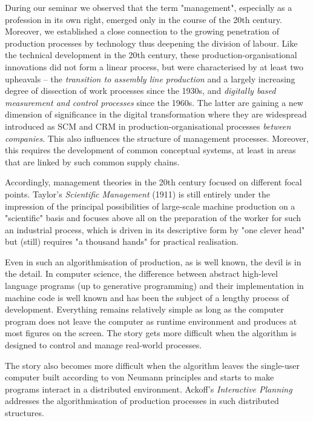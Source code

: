 \documentclass[11pt,a4paper]{article}
\begin{document}
During our seminar we observed that the term "management", especially as a
profession in its own right, emerged only in the course of the 20th century.
Moreover, we established a close connection to the growing penetration of
production processes by technology thus deepening the division of labour. Like
the technical development in the 20th century, these production-organisational
innovations did not form a linear process, but were characterised by at least
two upheavals -- the \emph{transition to assembly line production} and a
largely increasing degree of dissection of work processes since the 1930s, and
\emph{digitally based measurement and control processes} since the 1960s. The
latter are gaining a new dimension of significance in the digital
transformation where they are widespread introduced as SCM and CRM in
production-organisational processes \emph{between companies}. This also
influences the structure of management processes. Moreover, this requires the
development of common conceptual systems, at least in areas that are linked by
such common supply chains.

Accordingly, management theories in the 20th century focused on different
focal points. Taylor's \emph{Scientific Management} (1911) is still entirely
under the impression of the principal possibilities of large-scale machine
production on a "scientific" basis and focuses above all on the preparation of
the worker for such an industrial process, which is driven in its descriptive
form by "one clever head" but (still) requires "a thousand hands" for
practical realisation.

Even in such an algorithmisation of production, as is well known, the devil is
in the detail. In computer science, the difference between abstract high-level
language programs (up to generative programming) and their implementation in
machine code is well known and has been the subject of a lengthy process of
development. Everything remains relatively simple as long as the computer
program does not leave the computer as runtime environment and produces at
most figures on the screen. The story gets more difficult when the algorithm
is designed to control and manage real-world processes.

The story also becomes more difficult when the algorithm leaves the
single-user computer built according to von Neumann principles and starts to
make programs interact in a distributed environment. Ackoff's
\emph{Interactive Planning} addresses the algorithmisation of production
processes in such distributed structures.
\end{document}
